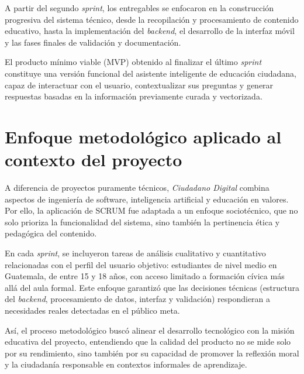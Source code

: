 A partir del segundo \textit{sprint}, los entregables se enfocaron en la
construcción progresiva del sistema técnico, desde la recopilación y
procesamiento de contenido educativo, hasta la implementación del
\textit{backend}, el desarrollo de la interfaz móvil y las fases finales de
validación y documentación.

El producto mínimo viable (MVP) obtenido al finalizar el último \textit{sprint}
constituye una versión funcional del asistente inteligente de educación
ciudadana, capaz de interactuar con el usuario, contextualizar sus preguntas y
generar respuestas basadas en la información previamente curada y vectorizada.

\section{Enfoque metodológico aplicado al contexto del proyecto}
A diferencia de proyectos puramente técnicos, \textit{Ciudadano Digital} combina
aspectos de ingeniería de software, inteligencia artificial y educación en
valores. Por ello, la aplicación de SCRUM fue adaptada a un enfoque
sociotécnico, que no solo prioriza la funcionalidad del sistema, sino también
la pertinencia ética y pedagógica del contenido.

En cada \textit{sprint}, se incluyeron tareas de análisis cualitativo y
cuantitativo relacionadas con el perfil del usuario objetivo: estudiantes de
nivel medio en Guatemala, de entre 15 y 18 años, con acceso limitado a
formación cívica más allá del aula formal. Este enfoque garantizó que las
decisiones técnicas (estructura del \textit{backend}, procesamiento de datos,
interfaz y validación) respondieran a necesidades reales detectadas en el
público meta.

Así, el proceso metodológico buscó alinear el desarrollo tecnológico con la
misión educativa del proyecto, entendiendo que la calidad del producto no se
mide solo por su rendimiento, sino también por su capacidad de promover la
reflexión moral y la ciudadanía responsable en contextos informales de
aprendizaje.

